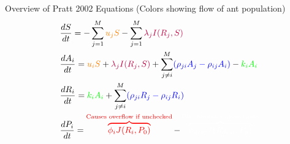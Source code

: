 \documentclass{beamer}
\makeatletter
\def\mcolor#1#{\@mcolor{#1}}
\def\@mcolor#1#2#3{%
  \protect\leavevmode
  \begingroup
    \color#1{#2}#3%
  \endgroup
}
\newcommand{\annotate}[3]{
\mcolor{#1}{\overbrace{#3}^\text{#2}}
}
\makeatother
\begin{document}
  \begin{frame}{Overview of Pratt 2002 Equations (Colors showing flow of ant population)}
      \Large
      \begin{equation}
      \begin{aligned}
          & \frac{dS}{dt} = - \sum_{j=1}^M \mcolor{orange}{u_jS} - \sum_{j=1}^M \mcolor{purple}{\lambda_jI(R_j, S)} \\
          & \frac{dA_i}{dt} = \mcolor{orange}{u_iS} + \mcolor{purple}{\lambda_jI(R_j, S)} + \sum_{j \neq i}^M \mcolor{blue}{(\rho_{ji}A_j - \rho_{ij}A_i)} - \mcolor{green}{k_iA_i} \\
          & \frac{dR_i}{dt} = \mcolor{green}{k_iA_i} + \sum_{j \neq i}^M \mcolor{blue}{(\rho_{ji}R_j - \rho_{ij}R_i)} \\
          & \frac{dP_i}{dt} = \annotate{red}{Causes overflow if unchecked}{\phi_iJ(R_i, P_0)} - \annotate{white}{Fix: Subtract moved ants}{\phi_{dest}J(R_{dest},P_0)}
      \end{aligned}
      \end{equation}
  \end{frame}
\end{document}
